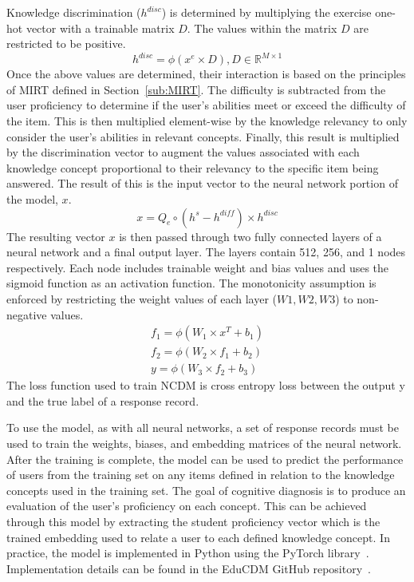 \documentclass[letterpaper, 12pt, captions=tableabove]{scrreprt}
\begin{document}
Knowledge discrimination ($h^{disc}$) is determined by multiplying the exercise one-hot vector with a trainable matrix $D$. The values within the matrix $D$ are restricted to be positive. 
\begin{equation}
\label{eqn:ncdmKdisc}
h^{disc} = \phi(x^e \times D), D \in \mathbb{R}^{M \times 1}
\end{equation}
Once the above values are determined, their interaction is based on the principles of MIRT defined in Section~\ref{sub:MIRT}. The difficulty is subtracted from the user proficiency to determine if the user's abilities meet or exceed the difficulty of the item. This is then multiplied element-wise by the knowledge relevancy to only consider the user's abilities in relevant concepts. Finally, this result is multiplied by the discrimination vector to augment the values associated with each knowledge concept proportional to their relevancy to the specific item being answered. The result of this is the input vector to the neural network portion of the model, $x$. 
\begin{equation}
\label{eqn:ncdmEmb}
x= Q_e \circ (h^s-h^{diff})\times h^{disc}
\end{equation}
The resulting vector $x$ is then passed through two fully connected layers of a neural network and a final output layer. The layers contain 512, 256, and 1 nodes respectively. Each node includes trainable weight and bias values and uses the sigmoid function as an activation function. The monotonicity assumption is enforced by restricting the weight values of each layer ($W1, W2, W3$) to non-negative values. 
\begin{equation}
\label{eqn:ncdmLayers}
	\begin{split}
		f_1 = \phi(W_1 \times x^T +b_1) \\
		f_2 = \phi(W_2 \times f_1 + b_2)\\
		y = \phi(W_3 \times f_2 + b_3)
	\end{split}
\end{equation}
The loss function used to train NCDM is cross entropy loss between the output y and the true label of a response record. 

To use the model, as with all neural networks, a set of response records must be used to train the weights, biases, and embedding matrices of the neural network. After the training is complete, the model can be used to predict the performance of users from the training set on any items defined in relation to the knowledge concepts used in the training set. The goal of cognitive diagnosis is to produce an evaluation of the user's proficiency on each concept. This can be achieved through this model by extracting the student proficiency vector which is the trained embedding used to relate a user to each defined knowledge concept. In practice, the model is implemented in Python using the PyTorch library~\cite{collobert2011}. Implementation details can be found in the EduCDM GitHub repository~\cite{bigdata2021}. 
\end{document}
